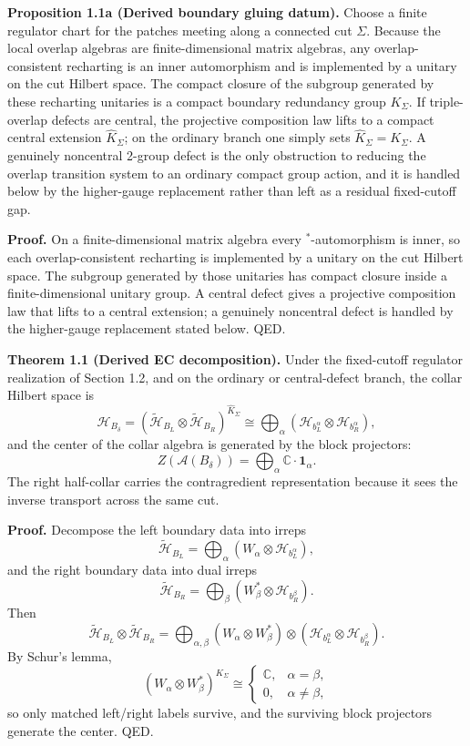 \textbf{Proposition 1.1a (Derived boundary gluing datum).} Choose a finite regulator chart for the patches meeting along a connected cut \(\Sigma\). Because the local overlap algebras are finite-dimensional matrix algebras, any overlap-consistent recharting is an inner automorphism and is implemented by a unitary on the cut Hilbert space. The compact closure of the subgroup generated by these recharting unitaries is a compact boundary redundancy group \(K_\Sigma\). If triple-overlap defects are central, the projective composition law lifts to a compact central extension \(\widehat K_\Sigma\); on the ordinary branch one simply sets \(\widehat K_\Sigma = K_\Sigma\). A genuinely noncentral 2-group defect is the only obstruction to reducing the overlap transition system to an ordinary compact group action, and it is handled below by the higher-gauge replacement rather than left as a residual fixed-cutoff gap.

\textbf{Proof.} On a finite-dimensional matrix algebra every \(^*\)-automorphism is inner, so each overlap-consistent recharting is implemented by a unitary on the cut Hilbert space. The subgroup generated by those unitaries has compact closure inside a finite-dimensional unitary group. A central defect gives a projective composition law that lifts to a central extension; a genuinely noncentral defect is handled by the higher-gauge replacement stated below. QED.

\textbf{Theorem 1.1 (Derived EC decomposition).} Under the fixed-cutoff regulator realization of Section 1.2, and on the ordinary or central-defect branch, the collar Hilbert space is
\[
\mathcal H_{B_\delta}
=
(\tilde{\mathcal H}_{B_L}\otimes \tilde{\mathcal H}_{B_R})^{\widehat K_\Sigma}
\cong
\bigoplus_{\alpha}
\left(\mathcal H_{b_L^\alpha}\otimes \mathcal H_{b_R^\alpha}\right),
\]
and the center of the collar algebra is generated by the block projectors:
\[
Z(\mathcal A(B_\delta))
=
\bigoplus_\alpha \mathbb C\cdot \mathbf 1_\alpha.
\]
The right half-collar carries the contragredient representation because it sees the inverse transport across the same cut.

\textbf{Proof.} Decompose the left boundary data into irreps
\[
\tilde{\mathcal H}_{B_L}
=
\bigoplus_\alpha
\left(W_\alpha\otimes \mathcal H_{b_L^\alpha}\right),
\]
and the right boundary data into dual irreps
\[
\tilde{\mathcal H}_{B_R}
=
\bigoplus_\beta
\left(W_\beta^*\otimes \mathcal H_{b_R^\beta}\right).
\]
Then
\[
\tilde{\mathcal H}_{B_L}\otimes \tilde{\mathcal H}_{B_R}
=
\bigoplus_{\alpha,\beta}
(W_\alpha\otimes W_\beta^*)\otimes
(\mathcal H_{b_L^\alpha}\otimes \mathcal H_{b_R^\beta}).
\]
By Schur's lemma,
\[
(W_\alpha\otimes W_\beta^*)^{\widehat K_\Sigma}
\cong
\begin{cases}
\mathbb C, & \alpha=\beta,\\
0, & \alpha\neq \beta,
\end{cases}
\]
so only matched left/right labels survive, and the surviving block projectors generate the center. QED.

